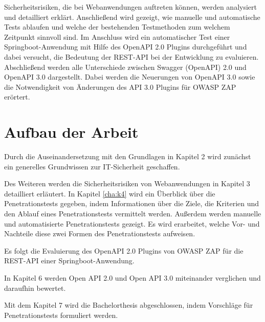 Sicherheitsrisiken, die bei Webanwendungen auftreten können, werden analysiert und detailliert erklärt. Anschließend wird gezeigt, wie manuelle und automatische Tests ablaufen und welche der bestehenden Testmethoden zum welchem Zeitpunkt sinnvoll sind. Im Anschluss wird ein automatischer Test einer Springboot-Anwendung mit Hilfe des OpenAPI 2.0 Plugins durchgeführt und dabei versucht, die Bedeutung der REST-API bei der Entwicklung zu evaluieren. Abschließend werden alle Unterschiede zwischen Swagger (OpenAPI) 2.0 und OpenAPI 3.0 dargestellt. Dabei werden die Neuerungen von OpenAPI 3.0 sowie die Notwendigkeit von Änderungen des API 3.0 Plugins für OWASP ZAP erörtert.

\section{Aufbau der Arbeit}

Durch die Auseinandersetzung mit den Grundlagen in Kapitel 2 wird zunächst ein generelles Grundwissen zur IT-Sicherheit geschaffen.

Des Weiteren werden die Sicherheitsrisiken von Webanwendungen in Kapitel 3 detailliert erläutert. In Kapitel \ref{cha:k4} wird ein Überblick über die Penetrationstests gegeben, indem Informationen über die Ziele, die Kriterien und den Ablauf eines Penetrationstests vermittelt werden. Außerdem werden manuelle und automatisierte Penetrationstests gezeigt. Es wird erarbeitet, welche Vor- und Nachteile diese zwei Formen des Penetrationstests aufweisen.

Es folgt die Evaluierung des OpenAPI 2.0 Plugins von OWASP ZAP für die REST-API einer Springboot-Anwendung.

In Kapitel 6 werden Open API 2.0 und Open API 3.0 miteinander verglichen und daraufhin bewertet.

Mit dem Kapitel 7 wird die Bachelorthesis abgeschlossen, indem Vorschläge für Penetrationstests formuliert werden.


